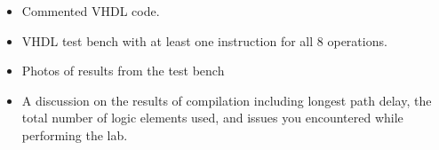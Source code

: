 \begin{itemize}
	\item Commented VHDL code.
	\item VHDL test bench with at least one instruction for all 8 operations.
	\item Photos of results from the test bench
	\item A discussion on the results of compilation including longest path delay, the total number of logic elements used, and issues you encountered while performing the lab.
\end{itemize}